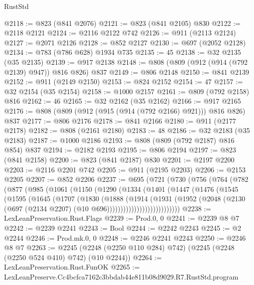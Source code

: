 \begin{lexlean}{RustStd}
\begin{coremodule}
@2118 := @823 (@841 @2076)
@2121 := @823 (@841 @2105) @830
@2122 := @2118 @2121
@2124 := @2116 @2122 @742
@2126 := @911 (@2113 @2124)
@2127 := @2071 @2126
@2128 := @852 @2127
@2130 := @697 (@2052 @2128)
@2134 := @783 (@786 @628) @1934 @735
@2135 := 45
@2138 := @32 @2135 (@35 @2135)
@2139 := @917 @2138
@2148 := @808 (@809 (@912 (@914 (@792 @2139) @947)) @816 @826) @837
@2149 := @806 @2148
@2150 := @841 @2139
@2152 := @911 (@2149 @2150)
@2153 := @824 @2152
@2154 := 47
@2157 := @32 @2154 (@35 @2154)
@2158 := @1000 @2157
@2161 := @809 (@792 @2158) @816
@2162 := 46
@2165 := @32 @2162 (@35 @2162)
@2166 := @917 @2165
@2176 := @808 (@809 (@912 (@915 (@914 (@792 @2166) @921))) @816 @826) @837
@2177 := @806 @2176
@2178 := @841 @2166
@2180 := @911 (@2177 @2178)
@2182 := @808 (@2161 @2180)
@2183 := 48
@2186 := @32 @2183 (@35 @2183)
@2187 := @1000 @2186
@2193 := @808 (@809 (@792 @2187) @816 @854) @837
@2194 := @2182 @2193
@2195 := @806 @2194
@2197 := @823 (@841 @2158)
@2200 := @823 (@841 @2187) @830
@2201 := @2197 @2200
@2203 := @2116 @2201 @742
@2205 := @911 (@2195 @2203)
@2206 := @2153 @2205
@2207 := @852 @2206
@2237 := @695
    (@721
      (@730
        (@756
          (@764
            (@782
              (@877
                (@985
                  (@1061
                    (@1150
                      (@1290
                        (@1334
                          (@1401
                            (@1447
                              (@1476
                                (@1545
                                  (@1595
                                    (@1645
                                      (@1707
                                        (@1830
                                          (@1888
                                            (@1914
                                              (@1931
                                                (@1952
                                                  (@2048
                                                    (@2130
                                                      (@697
                                                        (@2134 @2207)
                                                        (@10 @696)))))))))))))))))))))))))))
@2238 := LexLeanPreservation.Rust.Flags
@2239 := Prod.{0, 0}
@2241 := @2239 @8 @7
@2242 := @2239 @2241
@2243 := Bool
@2244 := @2242 @2243
@2245 := @2 @2244
@2246 := Prod.mk.{0, 0}
@2248 := @2246 @2241 @2243
@2250 := @2246 @8 @7
@2263 := @2245 (@2248 (@2250 @110 @284) @742) (@2245 (@2248 (@2250 @524 @410) @742) (@10 @2244))
@2264 := LexLeanPreservation.Rust.FunOK
@2265 := LexLeanPreserve.Cc4bcfca7162c3bbdab44e811b08d9029.R7.RustStd.program

\end{coremodule}
\end{lexlean}
